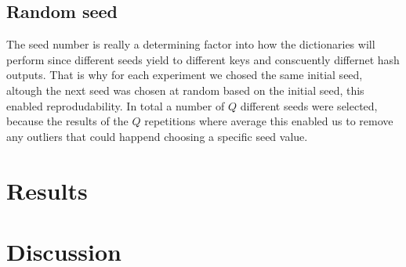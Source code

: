 \documentclass{article}
\begin{document}
    \subsection*{Random seed}
    		The seed number is really a determining factor into how the dictionaries will perform since different seeds yield to different keys and conscuently differnet hash outputs. 
    		That is why for each experiment we chosed the same initial seed, altough the next seed was chosen at random based on the initial seed, this enabled reprodudability. In total 
    		a number of $Q$ different seeds were selected, because the results of the $Q$ repetitions where average this enabled us to remove any outliers that could happend choosing a specific seed value. 
    		
    		
    

    \section{Results}

    \section{Discussion}



    \printbibliography
\end{document}
